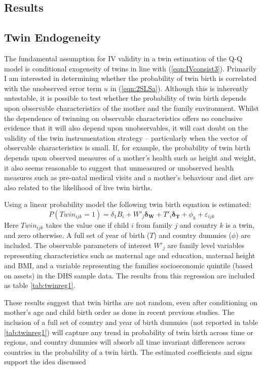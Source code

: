 \documentclass{article}[11pt,subeqn]
\newcommand{\vect}[1]{\mathbf{#1}}
\begin{document}
\begin{spacing}{1.5}
\section{Results}
\label{scn:results}
\subsection{Twin Endogeneity}
\label{scn:twinendog}
The fundamental assumption for IV validity in a twin estimation of the Q-Q model is conditional exogeneity of twins in line with (\ref{eqn:IVconsist3}).
Primarily I am interested in determining whether the probability of twin birth is correlated with the unobserved error term $u$ in (\ref{eqn:2SLSa}).  
Although this is inherently untestable, it is possible to test whether the probability of twin birth depends upon observable characteristics of the mother 
and the family environment.  Whilst the dependence of twinning on observable characteristics offers no conclusive evidence that it will also 
depend upon unobservables, it will cast doubt on the validity of the twin instrumentation strategy -- particularly when the vector of observable 
characteristics is small.  If, for example, the probability of twin birth depends upon observed measures of a mother's health such as height and weight, 
it also seems reasonable to suggest that unmeasured or unobserved health measures such as pre-natal medical visits and a mother's behaviour and diet
are also related to the likelihood of live twin births. 
 
Using a linear probability model the following twin birth equation is estimated: 
\begin{equation}
\label{eqn:twinpred}
P(Twin_{ijk}=1)=\delta_1 B_i + W'_j\vect{\delta_\vect{W}}+ T'_{i}\vect{\delta_\vect{T}} +  \phi_k + \varepsilon_{ijk}
\end{equation}
Here $Twin_{ijk}$ takes the value one if child $i$ from family $j$ and country $k$ is a twin, and zero otherwise.  A full set of year of birth ($T$) and country
dummies ($\phi$) are included.  The observable parameters of interest $W'_j$ are family level variables representing characteristics such as maternal age and
education, maternal height and BMI, and a variable representing the families socioeconomic quintile (based on assets) in the DHS sample data. The results from this 
regression are included as table \ref{tab:twinreg1}.

These results suggest that twin births are not random, even after conditioning on mother's age and child birth order as done in recent previous studies.  The
inclusion of a full set of country and year of birth dummies (not reported in table \ref{tab:twinreg1}) will capture any trend in
probability of twin birth across time or regions, and country dummies will absorb all time invariant differences across countries in the probability of a twin birth.  
The estimated coefficients and signs support the idea discussed 



\end{spacing}
\end{document}
